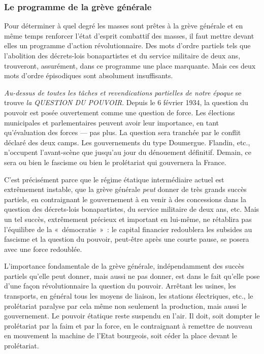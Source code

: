 \documentclass[french,twoside]{book} %
\begin{document}
\subsubsection[{Le programme de la grève générale}]{Le programme de la grève générale}
\noindent Pour déterminer à quel degré les masses sont prêtes à la grève générale et en même temps renforcer l’état d’esprit combattif des masses, il faut mettre devant elles un programme d’action révolutionnaire. Des mots d’ordre partiels tels que l’abolition des décrets-lois bonapartistes et du service militaire de deux ans, trouveront, assurément, dans ce programme une place marquante. Mais ces deux mots d’ordre épisodiques sont absolument insuffisants.\par
\emph{Au-dessus de toutes les tâches et revendications partielles de notre époque} se trouve \emph{la QUESTION DU POUVOIR}. Depuis le 6 février 1934, la question du pouvoir est posée ouvertement comme une question de force. Les élections municipales et parlementaires peuvent avoir leur importance, en tant qu’évaluation des forces — pas plus. La question sera tranchée par le conflit déclaré des deux camps. Les gouvernements du type Doumergue. Flandin, etc., n’occupent l’avant-scène que jusqu’au jour du dénouement définitif. Demain, ce sera ou bien le fascisme ou bien le prolétariat qui gouvernera la France.\par
 C’est précisément parce que le régime étatique intermédiaire actuel est extrêmement instable, que la grève générale \emph{peut} donner de très grands succès partiels, en contraignant le gouvernement à en venir à des concessions dans la question des décrets-lois bonapartistes, du service militaire de deux ans, etc. Mais un tel succès, extrêmement précieux et important en lui-même, ne rétablira pas l’équilibre de la « démocratie » : le capital financier redoublera les subsides au fascisme et la question du pouvoir, peut-être après une courte pause, se posera avec une force redoublée.\par
L’importance fondamentale de la grève générale, indépendamment des succès partiels qu’elle peut donner, mais aussi ne pas donner, est dans le fait qu’elle pose d’une façon révolutionnaire la question du pouvoir. Arrêtant les usines, les transports, en général tous les moyens de liaison, les stations électriques, etc., le prolétariat paralyse par cela même non seulement la production, mais aussi le gouvernement. Le pouvoir étatique reste suspendu en l’air. Il doit, soit dompter le prolétariat par la faim et par la force, en le contraignant à remettre de nouveau en mouvement la machine de l’Etat bourgeois, soit céder la place devant le prolétariat.\par
\end{document}
